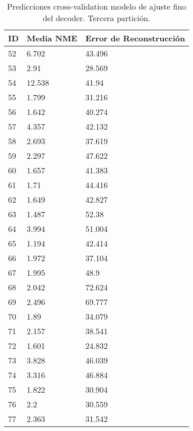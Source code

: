\begin{table}[!ht]
    \centering
    \caption{Predicciones cross-validation modelo de ajuste fino del  decoder. Tercera partición.}
    \begin{tabular}{|l|l|l|}
    \hline
    \cellcolor{gray!25}\textbf{ID} & \cellcolor{gray!25}\textbf{Media NME} & \cellcolor{gray!25}\textbf{Error de Reconstrucción}\\ \hline
        52 & 6.702 & 43.496 \\ \hline
        53 & 2.91 & 28.569 \\ \hline
        54 & 12.538 & 41.94 \\ \hline
        55 & 1.799 & 31.216 \\ \hline
        56 & 1.642 & 40.274 \\ \hline
        57 & 4.357 & 42.132 \\ \hline
        58 & 2.693 & 37.619 \\ \hline
        59 & 2.297 & 47.622 \\ \hline
        60 & 1.657 & 41.383 \\ \hline
        61 & 1.71 & 44.416 \\ \hline
        62 & 1.649 & 42.827 \\ \hline
        63 & 1.487 & 52.38 \\ \hline
        64 & 3.994 & 51.004 \\ \hline
        65 & 1.194 & 42.414 \\ \hline
        66 & 1.972 & 37.104 \\ \hline
        67 & 1.995 & 48.9 \\ \hline
        68 & 2.042 & 72.624 \\ \hline
        69 & 2.496 & 69.777 \\ \hline
        70 & 1.89 & 34.079 \\ \hline
        71 & 2.157 & 38.541 \\ \hline
        72 & 1.601 & 24.832 \\ \hline
        73 & 3.828 & 46.039 \\ \hline
        74 & 3.316 & 46.884 \\ \hline
        75 & 1.822 & 30.904 \\ \hline
        76 & 2.2 & 30.559 \\ \hline
        77 & 2.363 & 31.542 \\ \hline
    \end{tabular}
    \label{table:Daugmentation_images_3}
\end{table}

